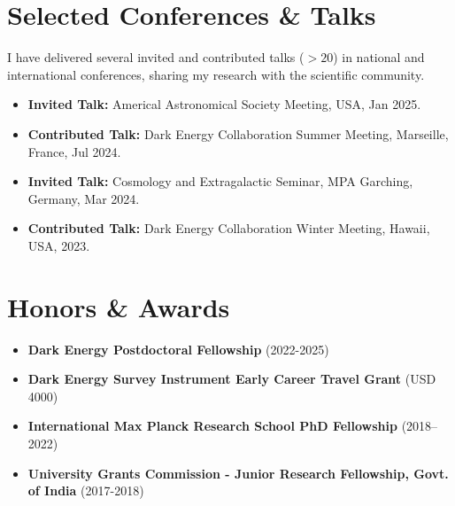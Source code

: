 \documentclass[a4paper,10pt]{article}
\begin{document}
\section*{Selected Conferences \& Talks}
I have delivered several invited and contributed talks ($>20$) in national and international conferences, sharing my research with the scientific community.
\begin{itemize}[noitemsep, topsep=0pt]
    \item \textbf{Invited Talk:} Americal Astronomical Society Meeting, USA, Jan 2025.
    \item \textbf{Contributed Talk:} Dark Energy Collaboration Summer Meeting,  Marseille, France, Jul 2024.
    \item \textbf{Invited Talk:} Cosmology and Extragalactic Seminar, MPA Garching, Germany, Mar 2024.
    \item \textbf{Contributed Talk:} Dark Energy Collaboration Winter Meeting, Hawaii, USA, 2023.
\end{itemize}

\section*{Honors \& Awards}
\begin{itemize}[noitemsep, topsep=0pt]
 \item \textbf{Dark Energy Postdoctoral Fellowship} (2022-2025)
    \item \textbf{Dark Energy Survey Instrument Early Career Travel Grant} (USD 4000)
    \item \textbf{International Max Planck Research School PhD Fellowship} (2018–2022)
    \item \textbf{University Grants Commission - Junior Research Fellowship, Govt. of India} (2017-2018)
\end{itemize}
\end{document}
